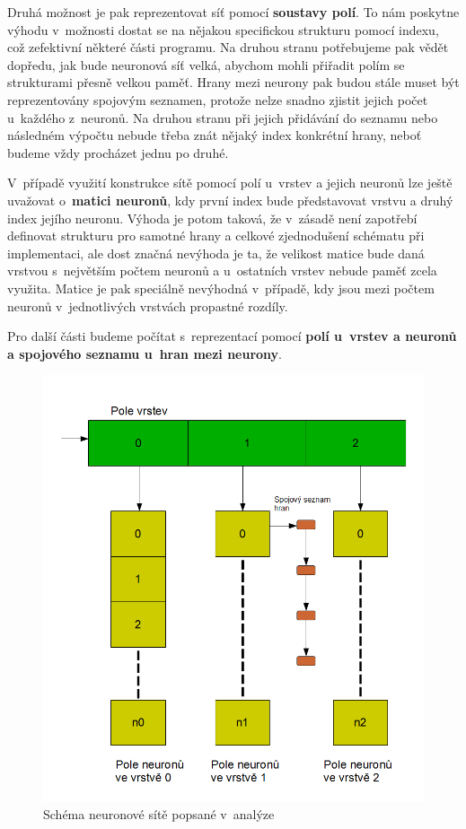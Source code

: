 \documentclass[11pt]{article}
\begin{document}
Druhá možnost je pak reprezentovat síť pomocí \textbf{soustavy polí}. To nám poskytne výhodu v~možnosti dostat se na nějakou specifickou strukturu pomocí indexu, což zefektivní některé části programu. Na druhou stranu potřebujeme pak vědět dopředu, jak bude neuronová síť velká, abychom mohli přiřadit polím se strukturami přesně velkou paměť. Hrany mezi neurony pak budou stále muset být reprezentovány spojovým seznamen, protože nelze snadno zjistit jejich počet u~každého z~neuronů. Na druhou stranu při jejich přidávání do seznamu nebo následném výpočtu nebude třeba znát nějaký index konkrétní hrany, neboť budeme vždy procházet jednu po druhé.

V~případě využití konstrukce sítě pomocí polí u~vrstev a jejich neuronů lze ještě uvažovat o~\textbf{matici neuronů}, kdy první index bude představovat vrstvu a druhý index jejího neuronu. Výhoda je potom taková, že v~zásadě není zapotřebí definovat strukturu pro samotné hrany a celkové zjednodušení schématu při implementaci, ale dost značná nevýhoda je ta, že velikost matice bude daná vrstvou s~největším počtem neuronů a u~ostatních vrstev nebude paměť zcela využita. Matice je pak speciálně nevýhodná v~případě, kdy jsou mezi počtem neuronů v~jednotlivých vrstvách propastné rozdíly.

Pro další části budeme počítat s~reprezentací pomocí \textbf{polí u~vrstev a neuronů a spojového seznamu u~hran mezi neurony}.

\begin{figure}[htbp]
\centering
\includegraphics[width = 15cm]{PCschema.png}
\begin{center}
\caption{Schéma neuronové sítě popsané v~analýze}
\end{center}
\end{figure}
\end{document}
